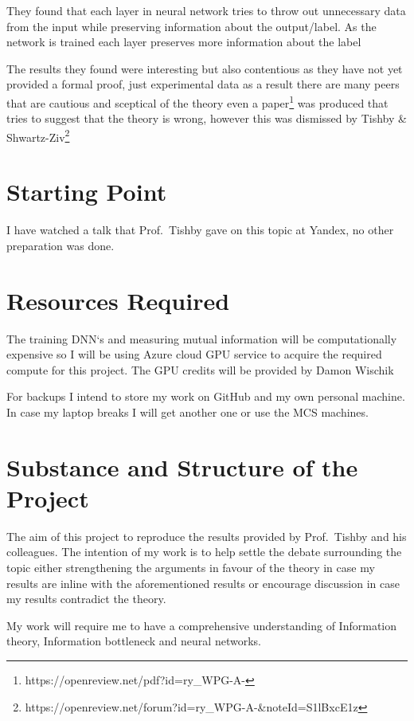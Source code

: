 \documentclass[12pt]{article}
\begin{document}
They found that each layer in neural network tries to throw out unnecessary data
from the input while preserving information about the output/label. As the
network is trained each layer preserves more information about the label

The results they found were interesting but also contentious as they have not
yet provided a formal proof, just experimental data as a result there are many
peers that are cautious and sceptical of the theory even a
paper\footnote{https://openreview.net/pdf?id=ry\_WPG-A-} was produced that tries
to suggest that the theory is wrong, however this was dismissed by Tishby \&
Shwartz-Ziv\footnote{https://openreview.net/forum?id=ry\_WPG-A-\&noteId=S1lBxcE1z}


\section*{Starting Point}

I have watched a talk that Prof.\ Tishby gave on this topic at Yandex, no other
preparation was done. 

\section*{Resources Required}

The training DNN`s and measuring mutual information will be computationally
expensive so I will be using Azure cloud GPU service to acquire the required
compute for this project. The GPU credits will be provided by Damon Wischik

For backups I intend to store my work on GitHub and my own personal machine. In
case my laptop breaks I will get another one or use the MCS machines.

\section*{Substance and Structure of the Project}

The aim of this project to reproduce the results provided by Prof.\ Tishby and
his colleagues. The intention of my work is to help settle the debate
surrounding the topic either strengthening the arguments in favour of the theory
in case my results are inline with the aforementioned results or encourage
discussion in case my results contradict the theory.

My work will require me to have a comprehensive understanding of Information
theory, Information bottleneck and neural networks.
\end{document}
